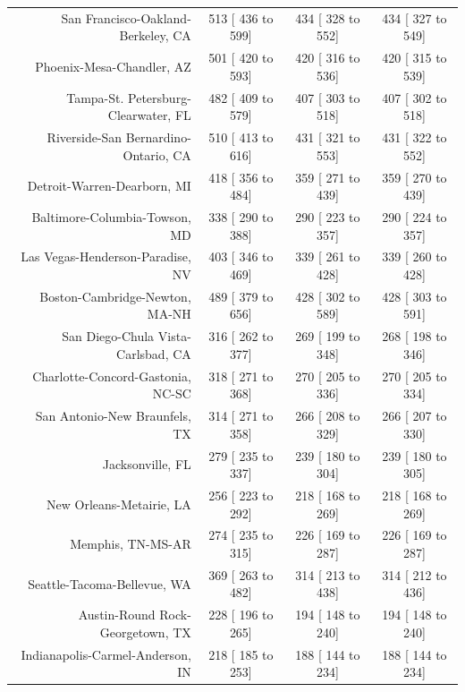 \documentclass{article}
\begin{document}
\begin{table}[H]
\begin{tabular}{|r|c|c|c|}
		San Francisco-Oakland-Berkeley, CA &    513 [   436 to    599] &    434 [   328 to    552] &    434 [   327 to    549]\\
		Phoenix-Mesa-Chandler, AZ &    501 [   420 to    593] &    420 [   316 to    536] &    420 [   315 to    539]\\
		Tampa-St. Petersburg-Clearwater, FL &    482 [   409 to    579] &    407 [   303 to    518] &    407 [   302 to    518]\\
		Riverside-San Bernardino-Ontario, CA &    510 [   413 to    616] &    431 [   321 to    553] &    431 [   322 to    552]\\
		Detroit-Warren-Dearborn, MI &    418 [   356 to    484] &    359 [   271 to    439] &    359 [   270 to    439]\\
		Baltimore-Columbia-Towson, MD &    338 [   290 to    388] &    290 [   223 to    357] &    290 [   224 to    357]\\
		Las Vegas-Henderson-Paradise, NV &    403 [   346 to    469] &    339 [   261 to    428] &    339 [   260 to    428]\\
		Boston-Cambridge-Newton, MA-NH &    489 [   379 to    656] &    428 [   302 to    589] &    428 [   303 to    591]\\
		San Diego-Chula Vista-Carlsbad, CA &    316 [   262 to    377] &    269 [   199 to    348] &    268 [   198 to    346]\\
		Charlotte-Concord-Gastonia, NC-SC &    318 [   271 to    368] &    270 [   205 to    336] &    270 [   205 to    334]\\
		San Antonio-New Braunfels, TX &    314 [   271 to    358] &    266 [   208 to    329] &    266 [   207 to    330]\\
		Jacksonville, FL &    279 [   235 to    337] &    239 [   180 to    304] &    239 [   180 to    305]\\
		New Orleans-Metairie, LA &    256 [   223 to    292] &    218 [   168 to    269] &    218 [   168 to    269]\\
		Memphis, TN-MS-AR &    274 [   235 to    315] &    226 [   169 to    287] &    226 [   169 to    287]\\
		Seattle-Tacoma-Bellevue, WA &    369 [   263 to    482] &    314 [   213 to    438] &    314 [   212 to    436]\\
		Austin-Round Rock-Georgetown, TX &    228 [   196 to    265] &    194 [   148 to    240] &    194 [   148 to    240]\\
		Indianapolis-Carmel-Anderson, IN &    218 [   185 to    253] &    188 [   144 to    234] &    188 [   144 to    234]\\

\end{tabular}
\end{table}
\end{document}
